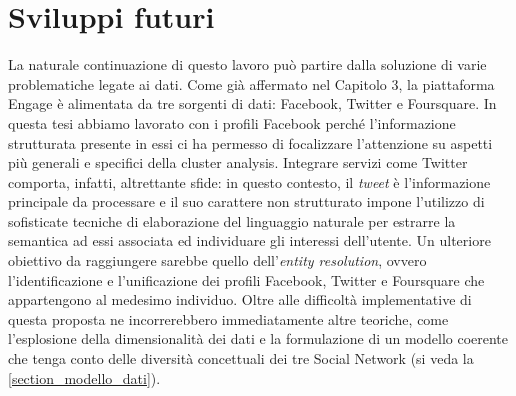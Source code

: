 \section{Sviluppi futuri}
La naturale continuazione di questo lavoro pu\`o partire dalla soluzione di varie problematiche legate ai dati. Come gi\`a affermato nel Capitolo 3, la piattaforma Engage \`e alimentata da tre sorgenti di dati: Facebook, Twitter e Foursquare. In questa tesi abbiamo lavorato con i profili Facebook perch\'e l'informazione strutturata presente in essi ci ha permesso di focalizzare l'attenzione su aspetti pi\`u generali e specifici della cluster analysis. Integrare servizi come Twitter comporta, infatti, altrettante sfide: in questo contesto, il \textit{tweet} \`e l'informazione principale da processare e il suo carattere non strutturato impone l'utilizzo di sofisticate tecniche di elaborazione del linguaggio naturale per estrarre la semantica ad essi associata ed individuare gli interessi dell'utente. Un ulteriore obiettivo da raggiungere sarebbe quello dell'\textit{entity resolution}, ovvero l'identificazione e l'unificazione dei profili Facebook, Twitter e Foursquare che appartengono al medesimo individuo. Oltre alle difficolt\`a implementative di questa proposta ne incorrerebbero immediatamente altre teoriche, come l'esplosione della dimensionalit\`a dei dati e la formulazione di un modello coerente che tenga conto delle diversit\`a concettuali dei tre Social Network (si veda la \autoref{section_modello_dati}).\\

